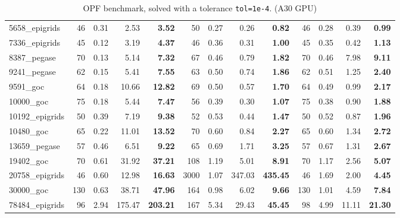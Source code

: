 \begin{table}[!ht]
{\begin{tabular}{|l|rrr >{\bfseries}r|rrr >{\bfseries}r|rrr >{\bfseries}r|}
5658\_epigrids & 46 & 0.31 & 2.53 & 3.52 & 50 & 0.27 & 0.26 & 0.82 & 46 & 0.28 & 0.39 & 0.99 \\
7336\_epigrids & 45 & 0.12 & 3.19 & 4.37 & 46 & 0.36 & 0.31 & 1.00 & 45 & 0.35 & 0.42 & 1.13 \\
8387\_pegase & 70 & 0.13 & 5.14 & 7.32 & 67 & 0.46 & 0.79 & 1.82 & 70 & 0.46 & 7.98 & 9.11 \\
9241\_pegase & 62 & 0.15 & 5.41 & 7.55 & 63 & 0.50 & 0.74 & 1.86 & 62 & 0.51 & 1.25 & 2.40 \\
			\hline
9591\_goc & 64 & 0.18 & 10.66 & 12.82 & 69 & 0.50 & 0.57 & 1.70 & 64 & 0.49 & 0.99 & 2.17 \\
10000\_goc & 75 & 0.18 & 5.44 & 7.47 & 56 & 0.39 & 0.30 & 1.07 & 75 & 0.38 & 0.90 & 1.88 \\
10192\_epigrids & 50 & 0.39 & 7.19 & 9.38 & 52 & 0.53 & 0.44 & 1.47 & 50 & 0.52 & 0.87 & 1.96 \\
10480\_goc & 65 & 0.22 & 11.01 & 13.52 & 70 & 0.60 & 0.84 & 2.27 & 65 & 0.60 & 1.34 & 2.72 \\
13659\_pegase & 57 & 0.46 & 6.51 & 9.22 & 65 & 0.69 & 1.71 & 3.25 & 57 & 0.67 & 1.31 & 2.67 \\
			\hline
19402\_goc & 70 & 0.61 & 31.92 & 37.21 & 108 & 1.19 & 5.01 & 8.91 & 70 & 1.17 & 2.56 & 5.07 \\
20758\_epigrids & 46 & 0.60 & 12.98 & 16.63 & 3000 & 1.07 & 347.03 & 435.45 & 46 & 1.69 & 2.00 & 4.45 \\
30000\_goc & 130 & 0.63 & 38.71 & 47.96 & 164 & 0.98 & 6.02 & 9.66 & 130 & 1.01 & 4.59 & 7.84 \\
78484\_epigrids & 96 & 2.94 & 175.47 & 203.21 & 167 & 5.34 & 29.43 & 45.45 & 98 & 4.99 & 11.11 & 21.30 \\
			\hline
		\end{tabular}
  }
  \caption{OPF benchmark, solved with a tolerance {\tt tol=1e-4}. (A30 GPU) \label{tab:opf:benchmark}}
\end{table}

